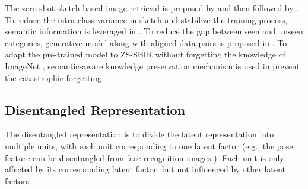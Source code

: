 \documentclass[10pt,twocolumn,letterpaper]{article}
\begin{document}
The zero-shot sketch-based image retrieval is proposed by \cite{shen2018zero} and then followed by \cite{yelamarthi2018zero, xu2019semantic, wang2019stacked, liu2019semantic, dutta2019semantically}. To reduce the intra-class variance in sketch and stabilize the training process, semantic information is leveraged in \cite{wang2019stacked, shen2018zero, xu2019semantic, dutta2019semantically}. To reduce the gap between seen and unseen categories, generative model along with aligned data pairs is proposed in \cite{yelamarthi2018zero}. To adapt the pre-trained model to ZS-SBIR without forgetting the knowledge of ImageNet \cite{deng2009imagenet} , semantic-aware knowledge preservation mechanism is used in \cite{liu2019semantic} prevent the catastrophic forgetting

\subsection{Disentangled Representation}
The disentangled representation is to divide the latent representation into multiple units, with each unit corresponding to one latent factor (e.g., the pose feature can be disentangled from face recognition images \cite{tran2017disentangled}). Each unit is only affected by its corresponding latent factor, but not influenced by other latent factors.

\end{document}
